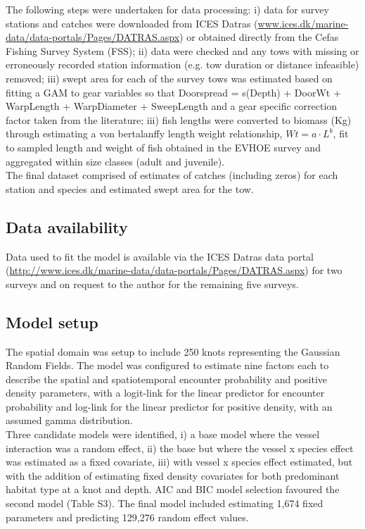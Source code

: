 \documentclass[fleqn,10pt]{wlscirep}
\begin{document}
\begin{linenumbers}
The following steps were undertaken for data processing: i) data for survey
stations and catches were downloaded from ICES Datras
(\url{www.ices.dk/marine-data/data-portals/Pages/DATRAS.aspx}) or obtained
directly from the Cefas Fishing Survey System (FSS); ii) data were checked and
any tows with missing or erroneously recorded station information (e.g. tow
duration or distance infeasible) removed; iii) swept area for each of the
survey tows was estimated based on fitting a GAM to gear variables so that
Doorspread = s(Depth) + DoorWt + WarpLength + WarpDiameter + SweepLength and a
gear specific correction factor taken from the literature\cite{Piet2009}; iii)
fish lengths were converted to biomass (Kg) through estimating a von
bertalanffy length weight relationship, $Wt = a \cdot L^{b}$, fit to sampled
length and weight of fish obtained in the EVHOE survey and aggregated within
size classes (adult and juvenile). \\

The final dataset comprised of estimates of catches (including zeros) for each
station and species and estimated swept area for the tow.\\

\subsection*{Data availability\\}

Data used to fit the model is available via the ICES Datras data portal
(\url{http://www.ices.dk/marine-data/data-portals/Pages/DATRAS.aspx}) for two
surveys and on request to the author for the remaining five surveys.\\

\subsection*{Model setup\\}

The spatial domain was setup to include 250 knots representing the Gaussian
Random Fields. The model was configured to estimate nine factors each to describe
the spatial and spatiotemporal encounter probability and positive density
parameters, with a logit-link for the linear predictor for encounter
probability and log-link for the linear predictor for positive density, with an
assumed gamma distribution.\\

Three candidate models were identified, i) a base model where the vessel
interaction was a random effect, ii) the base but where the vessel x species
effect was estimated as a fixed covariate, iii) with vessel x species effect
estimated, but with the addition of estimating fixed density covariates for
both predominant habitat type at a knot and depth. AIC and BIC model selection
favoured the second model (Table S3). The final model included estimating 1,674
fixed parameters and predicting 129,276 random effect values.\\


\end{linenumbers}
\end{document}
